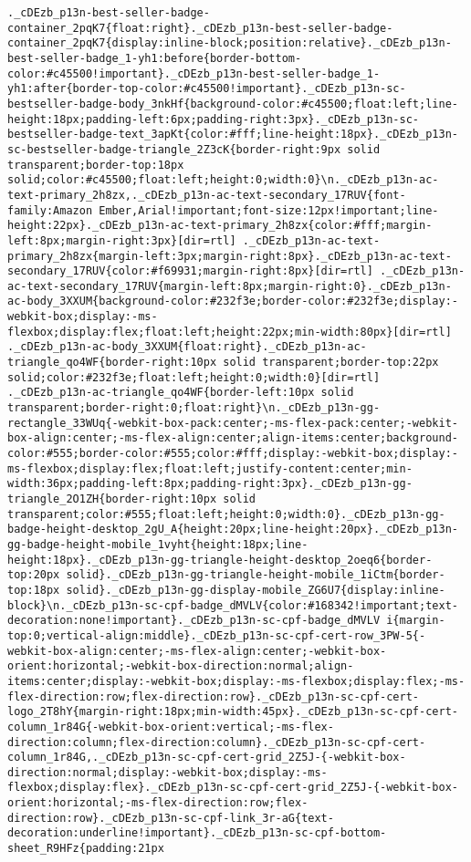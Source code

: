 \documentclass[
]{article}
\begin{document}
\begin{verbatim}
._cDEzb_p13n-best-seller-badge-container_2pqK7{float:right}._cDEzb_p13n-best-seller-badge-container_2pqK7{display:inline-block;position:relative}._cDEzb_p13n-best-seller-badge_1-yh1:before{border-bottom-color:#c45500!important}._cDEzb_p13n-best-seller-badge_1-yh1:after{border-top-color:#c45500!important}._cDEzb_p13n-sc-bestseller-badge-body_3nkHf{background-color:#c45500;float:left;line-height:18px;padding-left:6px;padding-right:3px}._cDEzb_p13n-sc-bestseller-badge-text_3apKt{color:#fff;line-height:18px}._cDEzb_p13n-sc-bestseller-badge-triangle_2Z3cK{border-right:9px solid transparent;border-top:18px solid;color:#c45500;float:left;height:0;width:0}\n._cDEzb_p13n-ac-text-primary_2h8zx,._cDEzb_p13n-ac-text-secondary_17RUV{font-family:Amazon Ember,Arial!important;font-size:12px!important;line-height:22px}._cDEzb_p13n-ac-text-primary_2h8zx{color:#fff;margin-left:8px;margin-right:3px}[dir=rtl] ._cDEzb_p13n-ac-text-primary_2h8zx{margin-left:3px;margin-right:8px}._cDEzb_p13n-ac-text-secondary_17RUV{color:#f69931;margin-right:8px}[dir=rtl] ._cDEzb_p13n-ac-text-secondary_17RUV{margin-left:8px;margin-right:0}._cDEzb_p13n-ac-body_3XXUM{background-color:#232f3e;border-color:#232f3e;display:-webkit-box;display:-ms-flexbox;display:flex;float:left;height:22px;min-width:80px}[dir=rtl] ._cDEzb_p13n-ac-body_3XXUM{float:right}._cDEzb_p13n-ac-triangle_qo4WF{border-right:10px solid transparent;border-top:22px solid;color:#232f3e;float:left;height:0;width:0}[dir=rtl] ._cDEzb_p13n-ac-triangle_qo4WF{border-left:10px solid transparent;border-right:0;float:right}\n._cDEzb_p13n-gg-rectangle_33WUq{-webkit-box-pack:center;-ms-flex-pack:center;-webkit-box-align:center;-ms-flex-align:center;align-items:center;background-color:#555;border-color:#555;color:#fff;display:-webkit-box;display:-ms-flexbox;display:flex;float:left;justify-content:center;min-width:36px;padding-left:8px;padding-right:3px}._cDEzb_p13n-gg-triangle_2O1ZH{border-right:10px solid transparent;color:#555;float:left;height:0;width:0}._cDEzb_p13n-gg-badge-height-desktop_2gU_A{height:20px;line-height:20px}._cDEzb_p13n-gg-badge-height-mobile_1vyht{height:18px;line-height:18px}._cDEzb_p13n-gg-triangle-height-desktop_2oeq6{border-top:20px solid}._cDEzb_p13n-gg-triangle-height-mobile_1iCtm{border-top:18px solid}._cDEzb_p13n-gg-display-mobile_ZG6U7{display:inline-block}\n._cDEzb_p13n-sc-cpf-badge_dMVLV{color:#168342!important;text-decoration:none!important}._cDEzb_p13n-sc-cpf-badge_dMVLV i{margin-top:0;vertical-align:middle}._cDEzb_p13n-sc-cpf-cert-row_3PW-5{-webkit-box-align:center;-ms-flex-align:center;-webkit-box-orient:horizontal;-webkit-box-direction:normal;align-items:center;display:-webkit-box;display:-ms-flexbox;display:flex;-ms-flex-direction:row;flex-direction:row}._cDEzb_p13n-sc-cpf-cert-logo_2T8hY{margin-right:18px;min-width:45px}._cDEzb_p13n-sc-cpf-cert-column_1r84G{-webkit-box-orient:vertical;-ms-flex-direction:column;flex-direction:column}._cDEzb_p13n-sc-cpf-cert-column_1r84G,._cDEzb_p13n-sc-cpf-cert-grid_2Z5J-{-webkit-box-direction:normal;display:-webkit-box;display:-ms-flexbox;display:flex}._cDEzb_p13n-sc-cpf-cert-grid_2Z5J-{-webkit-box-orient:horizontal;-ms-flex-direction:row;flex-direction:row}._cDEzb_p13n-sc-cpf-link_3r-aG{text-decoration:underline!important}._cDEzb_p13n-sc-cpf-bottom-sheet_R9HFz{padding:21px 
\end{verbatim}
\end{document}
